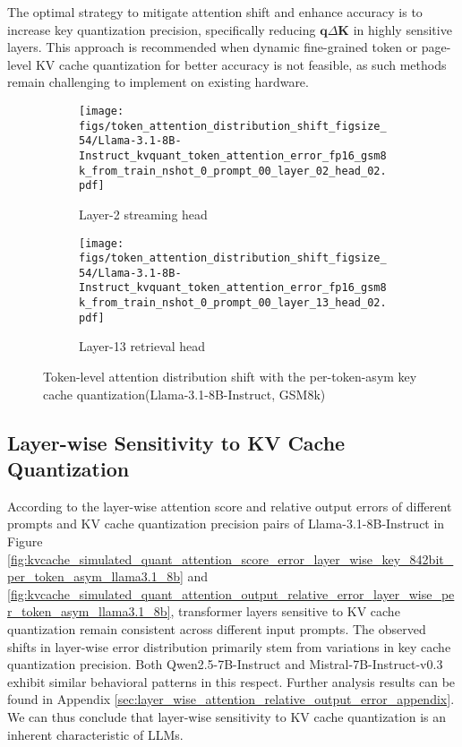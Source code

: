 The optimal strategy to mitigate attention shift and enhance accuracy is to increase key quantization precision, specifically reducing $\boldsymbol{q}\Delta \boldsymbol{K}$ in highly sensitive layers. This approach is recommended when dynamic fine-grained token or page-level KV cache quantization for better accuracy is not feasible, as such methods remain challenging to implement on existing hardware.

\begin{figure}[H]\vspace{-2mm}
\centering
    \begin{subfigure}{0.45\columnwidth}
    \texttt{[image: figs/token\_attention\_distribution\_shift\_figsize\_54/Llama-3.1-8B-Instruct\_kvquant\_token\_attention\_error\_fp16\_gsm8k\_from\_train\_nshot\_0\_prompt\_00\_layer\_02\_head\_02.pdf]}
    \caption{Layer-2 streaming head}
    \label{fig:attention_distribution_Llama3.1-8B-Instruct_gsm8k_zeroshot_first_prompt_layer_2}
    \end{subfigure}\hspace{3mm}
    \begin{subfigure}{0.45\columnwidth}
    \texttt{[image: figs/token\_attention\_distribution\_shift\_figsize\_54/Llama-3.1-8B-Instruct\_kvquant\_token\_attention\_error\_fp16\_gsm8k\_from\_train\_nshot\_0\_prompt\_00\_layer\_13\_head\_02.pdf]}
    \caption{Layer-13 retrieval head}
    \label{fig:attention_distribution_Llama3.1-8B-Instruct_gsm8k_zeroshot_first_prompt_layer_13}
    \end{subfigure}
    \caption{Token-level attention distribution shift with the per-token-asym key cache quantization(Llama-3.1-8B-Instruct, GSM8k)}
    \label{fig:token_level_attention_distribution_shift_per_token_asym_quant_Llama-3.1-8B-Instruct}
\end{figure}



\subsection{Layer-wise Sensitivity to KV Cache Quantization}
\label{sec:layer_wise_sensitivity_kvcache_quant}
According to the layer-wise attention score and relative output errors of different prompts and KV cache quantization precision pairs of Llama-3.1-8B-Instruct in Figure \ref{fig:kvcache_simulated_quant_attention_score_error_layer_wise_key_842bit_per_token_asym_llama3.1_8b} and \ref{fig:kvcache_simulated_quant_attention_output_relative_error_layer_wise_per_token_asym_llama3.1_8b}, transformer layers sensitive to KV cache quantization remain consistent across different input prompts. The observed shifts in layer-wise error distribution primarily stem from variations in key cache quantization precision. Both Qwen2.5-7B-Instruct and Mistral-7B-Instruct-v0.3 exhibit similar behavioral patterns in this respect. Further analysis results can be found in Appendix \ref{sec:layer_wise_attention_relative_output_error_appendix}. We can thus conclude that layer-wise sensitivity to KV cache quantization is an inherent characteristic of LLMs. 

